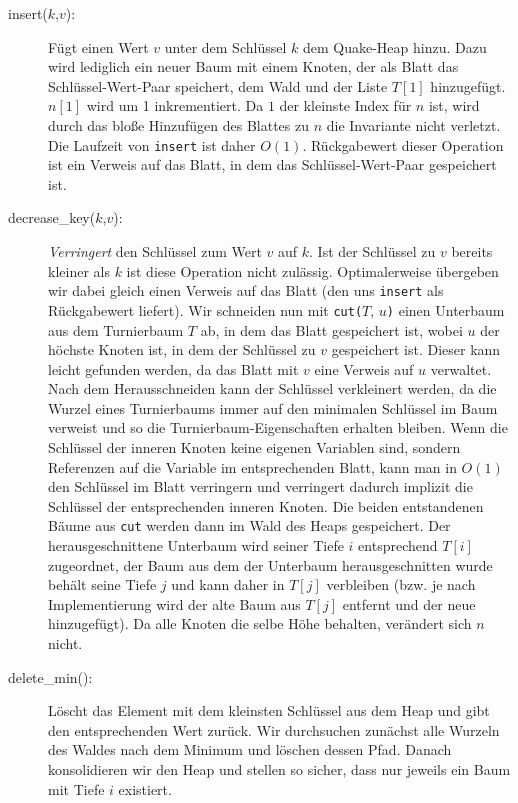 \documentclass[a4paper,10pt]{article}
\begin{document}
\begin{description}
\item[insert($k$,$v$):]
    Fügt einen Wert $v$ unter dem Schlüssel $k$ dem Quake-Heap hinzu. 
    Dazu wird lediglich ein neuer Baum mit einem Knoten, der als Blatt das Schlüssel-Wert-Paar speichert, dem Wald und der Liste $T[1]$ hinzugefügt. 
    $n[1]$ wird um 1 inkrementiert. 
    Da $1$ der kleinste Index für $n$ ist, wird durch das bloße Hinzufügen des Blattes zu $n$ die Invariante nicht verletzt.
    Die Laufzeit von \verb!insert! ist daher $O(1)$. 
    Rückgabewert dieser Operation ist ein Verweis auf das Blatt, in dem das Schlüssel-Wert-Paar gespeichert ist.
\item[decrease\_key($k$,$v$):]
    \emph{Verringert} den Schlüssel zum Wert $v$ auf $k$. Ist der Schlüssel zu $v$ bereits kleiner als $k$ ist diese Operation nicht zulässig.
    Optimalerweise übergeben wir dabei gleich einen Verweis auf das Blatt (den uns \verb!insert! als Rückgabewert liefert).
    Wir schneiden nun mit \verb!cut(!$T$, $u$\verb!)! einen Unterbaum aus dem Turnierbaum $T$ ab, in dem das Blatt gespeichert ist, wobei $u$ der höchste Knoten ist, in dem der Schlüssel zu $v$ gespeichert ist.
    Dieser kann leicht gefunden werden, da das Blatt mit $v$ eine Verweis auf $u$ verwaltet.
    Nach dem Herausschneiden kann der Schlüssel verkleinert werden, da die Wurzel eines Turnierbaums immer auf den minimalen Schlüssel im Baum verweist und so die Turnierbaum-Eigenschaften erhalten bleiben. Wenn die Schlüssel der inneren Knoten keine eigenen Variablen sind, sondern Referenzen auf die Variable im entsprechenden Blatt, kann man in $O(1)$ den Schlüssel im Blatt verringern und verringert dadurch implizit die Schlüssel der entsprechenden inneren Knoten.
    Die beiden entstandenen Bäume aus \verb!cut! werden dann im Wald des Heaps gespeichert. 
    Der herausgeschnittene Unterbaum wird seiner Tiefe $i$ entsprechend $T[i]$ zugeordnet, der Baum aus dem der Unterbaum herausgeschnitten wurde behält seine Tiefe $j$ und kann daher in $T[j]$ verbleiben (bzw. je nach Implementierung wird der alte Baum aus $T[j]$ entfernt und der neue hinzugefügt). 
    Da alle Knoten die selbe Höhe behalten, verändert sich $n$ nicht. 
\item[delete\_min():]
    Löscht das Element mit dem kleinsten Schlüssel aus dem Heap und gibt den entsprechenden Wert zurück.
    Wir durchsuchen zunächst alle Wurzeln des Waldes nach dem Minimum und löschen dessen Pfad.
    Danach konsolidieren wir den Heap und stellen so sicher, dass nur jeweils ein Baum mit Tiefe $i$ existiert.

\end{description}
\end{document}

